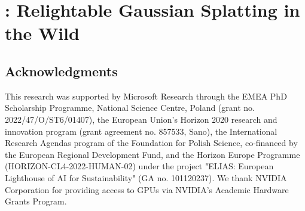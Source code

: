 \chapter{\lumigauss: Relightable Gaussian Splatting in the Wild}
\newcommand{\lumigaussdirname}{5_lumigauss}
\newcommand{\lumigaussassets}{assets/\lumigaussdirname/}

\label{chap:lumigauss}

\lumigaussteaserfigure









\section*{Acknowledgments}
  This research was supported by Microsoft Research through the EMEA PhD
  Scholarship Programme, National Science Centre, Poland (grant no.
  2022/47/O/ST6/01407), the European Union’s Horizon 2020 research
  and innovation program (grant agreement no. 857533, Sano), the International
  Research Agendas program of the Foundation for Polish Science, co-financed by
  the European Regional Development Fund, and the Horizon Europe Programme
  (HORIZON-CL4-2022-HUMAN-02) under the project "ELIAS: European Lighthouse of
  AI for Sustainability" (GA no. 101120237).
  We thank NVIDIA Corporation for providing access to GPUs via NVIDIA’s
  Academic Hardware Grants Program.

  \clearpage
  

